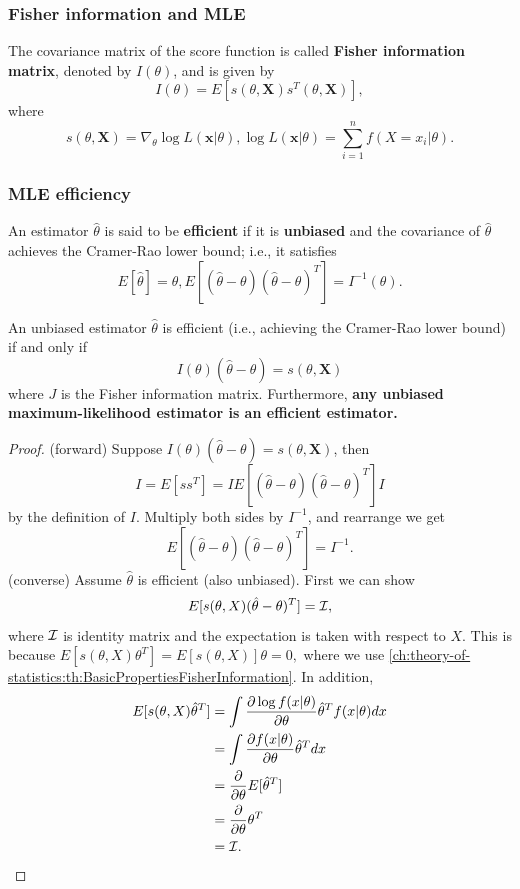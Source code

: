 \begin{refsection}
\subsubsection{Fisher information and MLE}

\begin{definition}
	The covariance matrix of the score function is called \textbf{Fisher information matrix}, denoted by $I(\theta)$, and is given by
	$$I(\theta) = E[s(\theta,\bm{X})s^T(\theta,\bm{X})],$$
where 	
$$s(\theta,\bm{X}) = \nabla_{\theta}\log L(\bm{x}|\theta) , 
\log L(\bm{x}|\theta) = \sum_{i=1}^n f(X=x_i|\theta).$$
\end{definition}


\subsubsection{MLE efficiency}

\begin{definition}
	An estimator $\hat{\theta}$ is said to be \textbf{efficient} if it is \textbf{unbiased} and the covariance of $\hat{\theta}$ achieves the Cramer-Rao lower bound; i.e., it satisfies
	$$E[\hat{\theta}] = \theta, E[(\hat{\theta}-\theta)(\hat{\theta}-\theta)^T] = I^{-1}(\theta).$$	
\end{definition}

\begin{theorem}\cite[552]{moon2000mathematical}\label{ch:theory-of-statistics:th:MLEEfficiency}
	An unbiased estimator $\hat{\theta}$ is efficient (i.e., achieving the Cramer-Rao lower bound) if and only if 
	$$I(\theta)(\hat{\theta}-\theta) = s(\theta,\bm{X})$$
	where $J$ is the Fisher information matrix.
	Furthermore, \textbf{any unbiased maximum-likelihood estimator is an efficient estimator.}
\end{theorem}
\begin{proof}
(forward) Suppose $I(\theta)(\hat{\theta}-\theta) = s(\theta,\bm{X})$, then $$I = E[ss^T] = IE[(\hat{\theta}-\theta)(\hat{\theta}-\theta)^T]I$$
	by the definition of $I$. Multiply both sides by $I^{-1}$, and rearrange we get
	$$E[(\hat{\theta}-\theta)(\hat{\theta}-\theta)^T] = I^{-1}.$$
	(converse) Assume $\hat{\theta}$ is efficient (also unbiased).  First we can show
$$E[s(\theta,X)(\hat{\theta} - \theta)^T] = \mathcal{I},$$
where $\mathcal{I}$ is identity matrix and the expectation is taken with respect to $X$. 
 This is because $E[s(\theta,X)\theta^T] = E[s(\theta,X)] \theta = 0,$
 where we use \autoref{ch:theory-of-statistics:th:BasicPropertiesFisherInformation}.
 In addition, 
 \begin{align*}
 E[s(\theta,X)\hat{\theta}^T] &= \int \frac{\partial \log f(x|\theta)}{\partial \theta} \hat{\theta}^T f(x|\theta) dx \\
 &=\int \frac{\partial f(x|\theta)}{\partial \theta} \hat{\theta}^T  dx \\
 &=\frac{\partial}{\partial \theta} E[\hat{\theta}^T] \\
 &=\frac{\partial}{\partial \theta} \theta^T \\
 &= \mathcal{I}. 
 \end{align*}


\end{proof}
\end{refsection}
